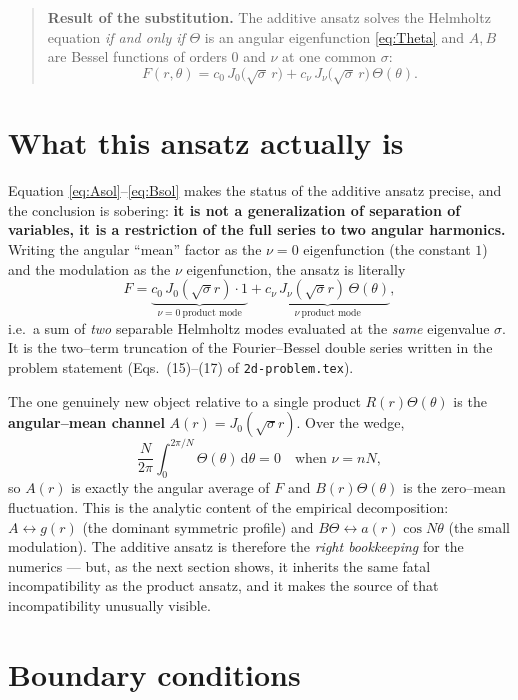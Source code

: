 \documentclass{article}
\newcommand{\rd}{\mathrm{d}}
\begin{document}
\begin{quote}
\textbf{Result of the substitution.} The additive ansatz solves the Helmholtz
equation \emph{if and only if} $\Theta$ is an angular eigenfunction
\eqref{eq:Theta} and $A,B$ are Bessel functions of orders $0$ and $\nu$ at one
common $\sigma$:
\[
F(r,\theta)=c_0\,J_0\!\bigl(\sqrt\sigma\,r\bigr)
+c_\nu\,J_\nu\!\bigl(\sqrt\sigma\,r\bigr)\,\Theta(\theta).
\]
\end{quote}

\section{What this ansatz actually is}

Equation \eqref{eq:Asol}--\eqref{eq:Bsol} makes the status of the additive
ansatz precise, and the conclusion is sobering: \textbf{it is not a
generalization of separation of variables, it is a restriction of the full
series to two angular harmonics.} Writing the angular ``mean'' factor as the
$\nu=0$ eigenfunction (the constant $1$) and the modulation as the $\nu$
eigenfunction, the ansatz is literally
\begin{equation}
F=\underbrace{c_0\,J_0(\sqrt\sigma r)\cdot 1}_{\nu=0\ \text{product mode}}
+\underbrace{c_\nu\,J_\nu(\sqrt\sigma r)\,\Theta(\theta)}_{\nu\ \text{product mode}},
\end{equation}
i.e.\ a sum of \emph{two} separable Helmholtz modes evaluated at the
\emph{same} eigenvalue $\sigma$. It is the two--term truncation of the
Fourier--Bessel double series written in the problem statement
(Eqs.~(15)--(17) of \texttt{2d-problem.tex}).

The one genuinely new object relative to a single product $R(r)\Theta(\theta)$
is the \textbf{angular--mean channel} $A(r)=J_0(\sqrt\sigma r)$. Over the wedge,
\[
\frac{N}{2\pi}\int_0^{2\pi/N}\Theta(\theta)\,\rd\theta=0
\quad\text{when }\nu=nN ,
\]
so $A(r)$ is exactly the angular average of $F$ and $B(r)\Theta(\theta)$ is the
zero--mean fluctuation. This is the analytic content of the empirical
decomposition: $A\leftrightarrow g(r)$ (the dominant symmetric profile) and
$B\Theta\leftrightarrow a(r)\cos N\theta$ (the small modulation). The additive
ansatz is therefore the \emph{right bookkeeping} for the numerics --- but, as the
next section shows, it inherits the same fatal incompatibility as the product
ansatz, and it makes the source of that incompatibility unusually visible.

\section{Boundary conditions}
\end{document}
